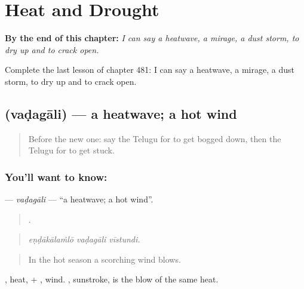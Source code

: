 
\chapter{Heat and Drought}
\label{ch:te-heat-and-drought}

\begin{chapteropening}
\textbf{By the end of this chapter:} \emph{I can say a heatwave, a mirage, a dust storm, to dry up and to crack open.}

Complete the last lesson of chapter 481: I can say a heatwave, a mirage, a dust storm, to dry up and to crack open.
\end{chapteropening}

\section[\texorpdfstring{\te{వడగాలి} (vaḍagāli)}{వడగాలి (vaḍagāli)}]{ (vaḍagāli) — a heatwave; a hot wind}

\label{lesson:TE-C481-vadagali}



\begin{quote}
Before the new one: say the Telugu for to get bogged down, then the Telugu for to get stuck.
\end{quote}

\subsection*{You'll want to know: }
\textbf{} — \emph{vaḍagāli} — \textquotedblleft{}a heatwave; a hot wind\textquotedblright{}.

\begin{quote}
  .
\end{quote}

\begin{quote}
\emph{eṇḍākālaṁlō vaḍagāli vīstundi.}
\end{quote}

\begin{quote}
In the hot season a scorching wind blows.
\end{quote}

, heat, + , wind. , sunstroke, is the blow of the same heat.

